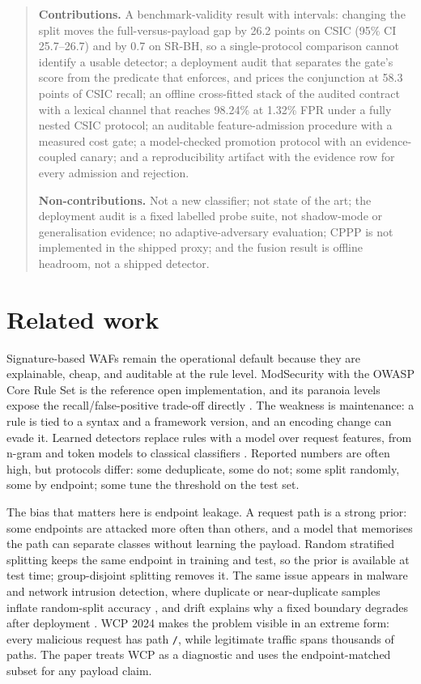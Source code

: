 \documentclass[preprint,11pt]{elsarticle}
\begin{document}
\begin{quote}
\textbf{Contributions.} A benchmark-validity result with intervals:
changing the split moves the full-versus-payload gap by 26.2 points on
CSIC (95\% CI 25.7--26.7) and by 0.7 on SR-BH, so a single-protocol
comparison cannot identify a usable detector; a deployment audit that
separates the gate's score from the predicate that enforces, and prices
the conjunction at 58.3 points of CSIC recall; an offline cross-fitted
stack of the audited contract with a lexical channel that reaches
98.24\% at 1.32\% FPR under a fully nested CSIC protocol; an auditable
feature-admission procedure with a measured cost gate; a model-checked
promotion protocol with an evidence-coupled canary; and a
reproducibility artifact with the evidence row for every admission and
rejection.

\textbf{Non-contributions.} Not a new classifier; not state of the art;
the deployment audit is a fixed labelled probe suite, not shadow-mode or
generalisation evidence; no adaptive-adversary evaluation; CPPP is not
implemented in the shipped proxy; and the fusion result is offline
headroom, not a shipped detector.
\end{quote}

\section{Related work}\label{related-work}

Signature-based WAFs remain the operational default because they are
explainable, cheap, and auditable at the rule level. ModSecurity with
the OWASP Core Rule Set is the reference open implementation, and its
paranoia levels expose the recall/false-positive trade-off directly
\citep{ristic2010modsecurity, owasp_crs}. The weakness is maintenance: a
rule is tied to a syntax and a framework version, and an encoding change
can evade it. Learned detectors replace rules with a model over request
features, from n-gram and token models
\citep{kruegel2003anomaly, robertson2006behavior} to classical
classifiers
\citep{torrano2010anomaly, sureda2022new, garcia2009anomaly}. Reported
numbers are often high, but protocols differ: some deduplicate, some do
not; some split randomly, some by endpoint; some tune the threshold on
the test set.

The bias that matters here is endpoint leakage. A request path is a
strong prior: some endpoints are attacked more often than others, and a
model that memorises the path can separate classes without learning the
payload. Random stratified splitting keeps the same endpoint in training
and test, so the prior is available at test time; group-disjoint
splitting removes it. The same issue appears in malware and network
intrusion detection, where duplicate or near-duplicate samples inflate
random-split accuracy \citep{arp2022dos, pendlebury2019tesseract}, and
drift explains why a fixed boundary degrades after deployment
\citep{gama2014survey}. WCP 2024 makes the problem visible in an extreme
form: every malicious request has path \texttt{/\allowbreak{}}, while legitimate
traffic spans thousands of paths. The paper treats WCP as a diagnostic
and uses the endpoint-matched subset for any payload claim.
\end{document}
